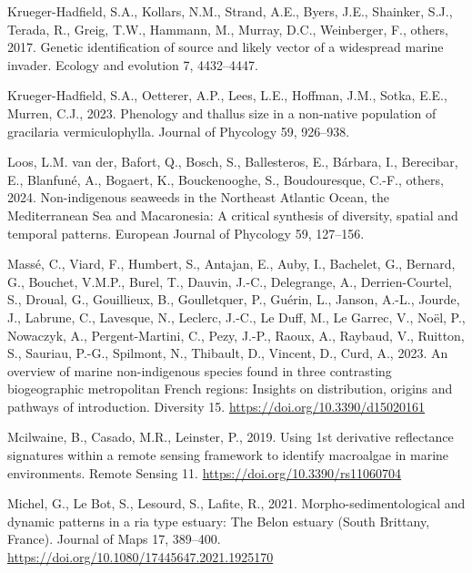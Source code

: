 \documentclass[
  letterpaper,
  DIV=11,
  numbers=noendperiod]{scrartcl}
\newlength{\cslhangindent}
\newenvironment{CSLReferences}[2] %
 {\begin{list}{}{%
  \setlength{\itemindent}{0pt}
  \setlength{\leftmargin}{0pt}
  \setlength{\parsep}{0pt}
  \ifodd #1
   \setlength{\leftmargin}{\cslhangindent}
   \setlength{\itemindent}{-1\cslhangindent}
  \fi
  \setlength{\itemsep}{#2\baselineskip}}}
 {\end{list}}
\begin{document}
\begin{CSLReferences}{1}{0}
Krueger-Hadfield, S.A., Kollars, N.M., Strand, A.E., Byers, J.E.,
Shainker, S.J., Terada, R., Greig, T.W., Hammann, M., Murray, D.C.,
Weinberger, F., others, 2017. Genetic identification of source and
likely vector of a widespread marine invader. Ecology and evolution 7,
4432--4447.

Krueger-Hadfield, S.A., Oetterer, A.P., Lees, L.E., Hoffman, J.M.,
Sotka, E.E., Murren, C.J., 2023. Phenology and thallus size in a
non-native population of gracilaria vermiculophylla. Journal of
Phycology 59, 926--938.

Loos, L.M. van der, Bafort, Q., Bosch, S., Ballesteros, E., Bárbara, I.,
Berecibar, E., Blanfuné, A., Bogaert, K., Bouckenooghe, S.,
Boudouresque, C.-F., others, 2024. Non-indigenous seaweeds in the
{N}ortheast {A}tlantic {O}cean, the {M}editerranean {S}ea and
{M}acaronesia: A critical synthesis of diversity, spatial and temporal
patterns. European Journal of Phycology 59, 127--156.

Massé, C., Viard, F., Humbert, S., Antajan, E., Auby, I., Bachelet, G.,
Bernard, G., Bouchet, V.M.P., Burel, T., Dauvin, J.-C., Delegrange, A.,
Derrien-Courtel, S., Droual, G., Gouillieux, B., Goulletquer, P.,
Guérin, L., Janson, A.-L., Jourde, J., Labrune, C., Lavesque, N.,
Leclerc, J.-C., Le Duff, M., Le Garrec, V., Noël, P., Nowaczyk, A.,
Pergent-Martini, C., Pezy, J.-P., Raoux, A., Raybaud, V., Ruitton, S.,
Sauriau, P.-G., Spilmont, N., Thibault, D., Vincent, D., Curd, A., 2023.
An overview of marine non-indigenous species found in three contrasting
biogeographic metropolitan {F}rench regions: Insights on distribution,
origins and pathways of introduction. Diversity 15.
\url{https://doi.org/10.3390/d15020161}

Mcilwaine, B., Casado, M.R., Leinster, P., 2019. Using 1st derivative
reflectance signatures within a remote sensing framework to identify
macroalgae in marine environments. Remote Sensing 11.
\url{https://doi.org/10.3390/rs11060704}

Michel, G., Le Bot, S., Lesourd, S., Lafite, R., 2021.
Morpho-sedimentological and dynamic patterns in a ria type estuary: The
{B}elon estuary ({S}outh {B}rittany, {F}rance). Journal of Maps 17,
389--400. \url{https://doi.org/10.1080/17445647.2021.1925170}


\end{CSLReferences}
\end{document}
